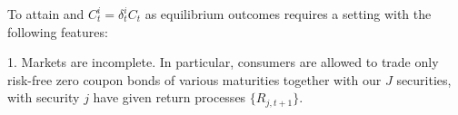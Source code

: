 %
%
%


To attain  and $C_t^i = \delta_t^i C_t$ %
as equilibrium outcomes requires a setting with the following features:

\medskip

\item{1.}  Markets are incomplete.  In particular, consumers are allowed to trade only risk-free zero coupon bonds of various maturities together with  our $J$ securities,  with security $j$ have given return processes $\{R_{j,t+1}\}$.

